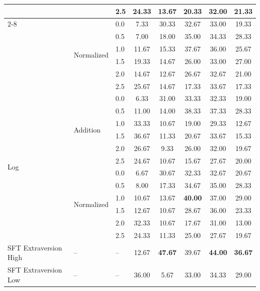 \begin{table}[htbp]
\begin{tabular}{lll ccccc}
     &  & 2.5 & 24.33 & 13.67 & 20.33 & 32.00 & 21.33 \\
    \cmidrule(lr){2-8}
     & \multirow{6}{*}{Normalized} & 0.0 & 7.33 & 30.33 & 32.67 & 33.00 & 19.33 \\
     &  & 0.5 & 7.00 & 18.00 & 35.00 & 34.33 & 28.33 \\
     &  & 1.0 & 11.67 & 15.33 & 37.67 & 36.00 & 25.67 \\
     &  & 1.5 & 19.33 & 14.67 & 26.00 & 33.00 & 27.00 \\
     &  & 2.0 & 14.67 & 12.67 & 26.67 & 32.67 & 21.00 \\
     &  & 2.5 & 25.67 & 14.67 & 17.33 & 33.67 & 17.33 \\
    \midrule
    \multirow{12}{*}{Log} & \multirow{6}{*}{Addition} & 0.0 & 6.33 & 31.00 & 33.33 & 32.33 & 19.00 \\
     &  & 0.5 & 11.00 & 14.00 & 38.33 & 37.33 & 28.33 \\
     &  & 1.0 & 33.33 & 10.67 & 19.00 & 29.33 & 12.67 \\
     &  & 1.5 & 36.67 & 11.33 & 20.67 & 33.67 & 15.33 \\
     &  & 2.0 & 26.67 & 9.33 & 26.00 & 32.00 & 19.67 \\
     &  & 2.5 & 24.67 & 10.67 & 15.67 & 27.67 & 20.00 \\
    \cmidrule(lr){2-8}
     & \multirow{6}{*}{Normalized} & 0.0 & 6.67 & 30.67 & 32.33 & 32.67 & 20.67 \\
     &  & 0.5 & 8.00 & 17.33 & 34.67 & 35.00 & 28.33 \\
     &  & 1.0 & 10.67 & 13.67 & \textbf{40.00} & 37.00 & 29.00 \\
     &  & 1.5 & 12.67 & 10.67 & 28.67 & 36.00 & 23.33 \\
     &  & 2.0 & 32.33 & 10.67 & 17.67 & 31.00 & 13.00 \\
     &  & 2.5 & 24.33 & 11.33 & 25.00 & 27.67 & 19.67 \\
    \midrule
    SFT Extraversion High & -- & -- & 12.67 & \textbf{47.67} & 39.67 & \textbf{44.00} & \textbf{36.67} \\
    SFT Extraversion Low & -- & -- & 36.00 & 5.67 & 33.00 & 34.33 & 29.00 \\
    \bottomrule
  \end{tabular}
\end{table}
